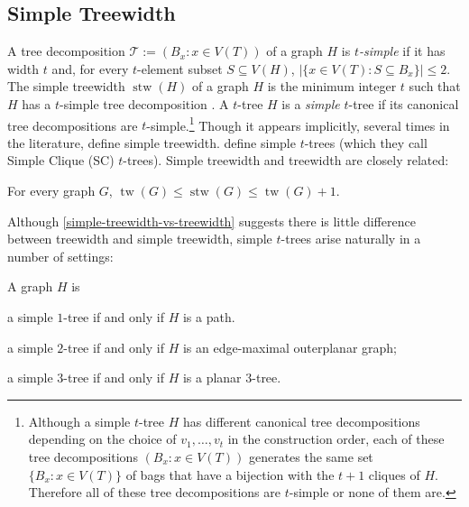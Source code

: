 \documentclass[kpfonts]{patmorin}
\DeclareMathOperator{\tw}{tw}
\DeclareMathOperator{\stw}{stw}
\theoremstyle{named}
\begin{document}
\subsection{Simple Treewidth}


A tree decomposition $\mathcal{T}:=(B_x:x\in V(T))$ of a graph $H$ is \emph{$t$-simple} if it has width $t$ and, for every $t$-element subset $S\subseteq V(H)$, $|\{x\in V(T):S\subseteq B_x\}|\le 2$.  The simple treewidth $\stw(H)$ of a graph $H$ is the minimum integer $t$ such that $H$ has a $t$-simple tree decomposition \cite{knauer.ueckerdt:simple}.  A $t$-tree $H$ is a \emph{simple} $t$-tree if its canonical tree decompositions are $t$-simple.\footnote{Although a simple $t$-tree $H$ has different canonical tree decompositions depending on the choice of $v_1,\ldots,v_t$ in the construction order, each of these tree decompositions $(B_x:x\in V(T))$ generates the same set $\{B_x:x\in V(T)\}$ of bags that have a bijection with the $t+1$ cliques of $H$.  Therefore all of these tree decompositions are $t$-simple or none of them are.}  Though it appears implicitly, several times in the literature, \citet{knauer.ueckerdt:simple} define simple treewidth.  \citet{markenzon.justel.ea:subclasses} define simple $t$-trees (which they call Simple Clique (SC) $t$-trees).  Simple treewidth and treewidth are closely related:

\begin{lem}\label{simple-treewidth-vs-treewidth}\cite{knauer.ueckerdt:simple}
    For every graph $G$, $\tw(G)\le \stw(G)\le \tw(G)+1$.
\end{lem}

Although \cref{simple-treewidth-vs-treewidth} suggests there is little difference between treewidth and simple treewidth, simple $t$-trees arise naturally in a number of settings:

\begin{lem}\label{simple-small-cases}
    A graph $H$ is
    \begin{compactenum}[(i)]
        \item a simple $1$-tree if and only if $H$ is a path.
        \item a simple $2$-tree if and only if $H$ is an edge-maximal outerplanar graph;
        \item a simple $3$-tree if and only if $H$ is a planar 3-tree.
    \end{compactenum}
\end{lem}
\end{document}
